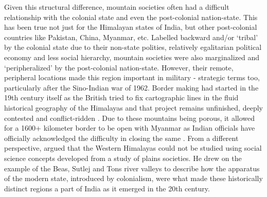 Given this structural difference, mountain societies often had a difficult relationship with the colonial state and even the post\hyp{}colonial nation\hyp{}state. This has been true not just for the Himalayan states of India, but other post\hyp{}colonial countries like Pakistan, China, Myanmar, etc. Labelled backward and/or ‘tribal’ by the colonial state due to their non\hyp{}state polities, relatively egalitarian political economy and less social hierarchy, mountain societies were also marginalized and ‘peripheralized’ by the post\hyp{}colonial nation\hyp{}state. However, their remote, peripheral locations made this region important in military \hyp{} strategic terms too, particularly after the Sino\hyp{}Indian war of 1962. Border making had started in the 19th century itself as the British tried to fix cartographic lines in the fluid historical geography of the Himalayas and that project remains unfinished, deeply contested and conflict\hyp{}ridden \citep{noorani2010india,guyot2017shadow,acharya2022boundaries}.  Due to these mountains being porous, it allowed for a 1600+ kilometer border to be open with Myanmar as Indian officials have officially acknowledged the difficulty in closing the same \citep{Bureau_2024}.  From a different perspective, \cite{alam2008becoming} argued that the Western Himalayas could not be studied using social science concepts developed from a study of plains societies. He drew on the example of the Beas, Sutlej and Tons river valleys to describe how the apparatus of the modern state, introduced by colonialism, were what made these historically distinct regions a part of India as it emerged in the 20th century.

